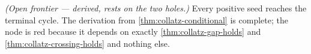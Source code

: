 \begin{theorem}
  \label{thm:collatz-accelerated}
  \notready
  \emph{(Open frontier --- derived, rests on the two holes.)} Every positive seed reaches the
  terminal cycle. The derivation from \cref{thm:collatz-conditional} is complete; the node is
  red because it depends on exactly \cref{thm:collatz-gap-holds} and
  \cref{thm:collatz-crossing-holds} and nothing else.
\end{theorem}
